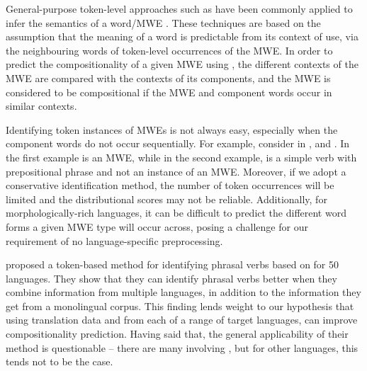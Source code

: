 \documentclass[output=paper
,modfonts
,nonflat]{langsci/langscibook}
\begin{document}
General-purpose token-level approaches such as 
have been commonly applied to infer the semantics of a word/MWE
\citep{Schone2001,Baldwin:2003,reddy2011a}. These techniques are based on
the assumption that the meaning of a word is predictable from its
context of use, via the neighbouring words of token-level
occurrences of the MWE. In order to predict the compositionality of a
given MWE using , the different contexts of the
MWE are compared with the contexts of its components, and the MWE is
considered to be compositional if the MWE and component words occur in
similar contexts.

Identifying token instances of MWEs is not always easy, especially when
the component words do not occur sequentially. For example, consider
 in , and
. In the first
example  is an MWE, while in the second example, 
is a simple verb with prepositional phrase and not an instance of an
MWE. Moreover, if we adopt a conservative identification method, the
number of token occurrences will be limited and the distributional
scores may not be reliable. Additionally, for morphologically-rich
languages, it can be difficult to predict the different word forms a
given MWE type will occur across, posing a challenge for our requirement
of no language-specific preprocessing.

\citet{pichotta2013} proposed a token-based method for identifying
 phrasal verbs based on  for 50 languages. They
show that they can identify phrasal verbs better when they combine
information from multiple languages, in addition to the information
they get from a monolingual corpus. This finding lends weight to our
hypothesis that using translation data and 
from each of a range of target languages, can improve compositionality
prediction. Having said that, the general applicability of their
method is questionable -- there are many  involving
, but for other languages, this tends not to be the case.
\end{document}
